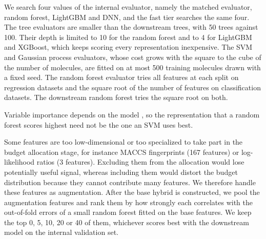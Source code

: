 We search four values of the internal evaluator, namely the matched evaluator, random forest, LightGBM and DNN, and the fast tier searches the same four.
The tree evaluators are smaller than the downstream trees, with 50 trees against 100. Their depth is limited to 10 for the random forest and to 4 for LightGBM and XGBoost, which keeps scoring every representation inexpensive. The SVM and Gaussian process evaluators, whose cost grows with the square to the cube of the number of molecules, are fitted on at most 500 training molecules drawn with a fixed seed. The random forest evaluator tries all features at each split on regression datasets and the square root of the number of features on classification datasets. The downstream random forest tries the square root on both.

Variable importance depends on the model \citep{Dong2020}, so the representation that a random forest scores highest need not be the one an SVM uses best.

Some features are too low-dimensional or too specialized to take part in the budget allocation stage, for instance MACCS fingerprints (167 features) or log-likelihood ratios (3 features). Excluding them from the allocation would lose potentially useful signal, whereas including them would distort the budget distribution because they cannot contribute many features. We therefore handle these features as augmentation. After the base hybrid is constructed, we pool the augmentation features and rank them by how strongly each correlates with the out-of-fold errors of a small random forest fitted on the base features. We keep the top 0, 5, 10, 20 or 40 of them, whichever scores best with the downstream model on the internal validation set.

